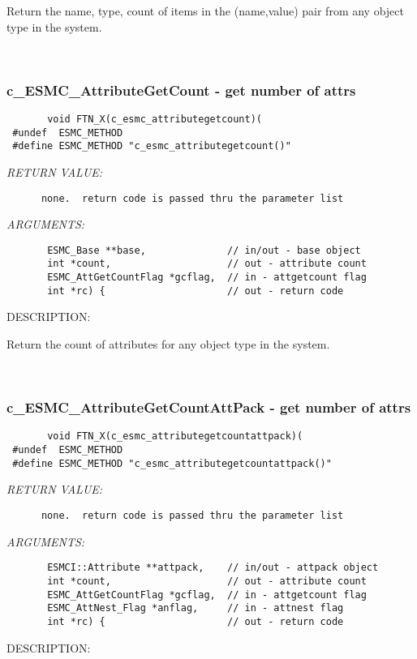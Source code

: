      Return the name, type, count of items in the (name,value) pair from any
     object type in the system.
   
 
\mbox{}\hrulefill\ 
 
\subsubsection [c\_ESMC\_AttributeGetCount] {c\_ESMC\_AttributeGetCount - get number of attrs}


  
\begin{verbatim}       void FTN_X(c_esmc_attributegetcount)(
 #undef  ESMC_METHOD
 #define ESMC_METHOD "c_esmc_attributegetcount()"\end{verbatim}{\em RETURN VALUE:}
\begin{verbatim}      none.  return code is passed thru the parameter list\end{verbatim}{\em ARGUMENTS:}
\begin{verbatim}       ESMC_Base **base,              // in/out - base object
       int *count,                    // out - attribute count
       ESMC_AttGetCountFlag *gcflag,  // in - attgetcount flag
       int *rc) {                     // out - return code\end{verbatim}
{\sf DESCRIPTION:\\ }


     Return the count of attributes for any object type in the system.
   
 
\mbox{}\hrulefill\ 
 
\subsubsection [c\_ESMC\_AttributeGetCountAttPack] {c\_ESMC\_AttributeGetCountAttPack - get number of attrs}


  
\begin{verbatim}       void FTN_X(c_esmc_attributegetcountattpack)(
 #undef  ESMC_METHOD
 #define ESMC_METHOD "c_esmc_attributegetcountattpack()"\end{verbatim}{\em RETURN VALUE:}
\begin{verbatim}      none.  return code is passed thru the parameter list\end{verbatim}{\em ARGUMENTS:}
\begin{verbatim}       ESMCI::Attribute **attpack,    // in/out - attpack object
       int *count,                    // out - attribute count
       ESMC_AttGetCountFlag *gcflag,  // in - attgetcount flag
       ESMC_AttNest_Flag *anflag,     // in - attnest flag
       int *rc) {                     // out - return code\end{verbatim}
{\sf DESCRIPTION:\\ }


